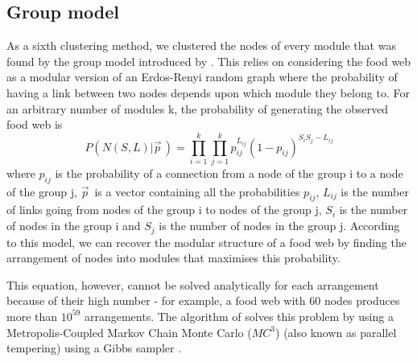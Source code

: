 \documentclass[twocolumn]{article}
\begin{document}
    \subsection*{Group model}
        As a sixth clustering method, we clustered the nodes of every module that was found by the group model introduced by \citet{Allesina2009a}. This relies on considering the food web as a modular version of an Erdos-Renyi random graph \citep{Erdos1959} where the probability of having a link between two nodes depends upon which module they belong to. For an arbitrary number of modules k, the probability of generating the observed food web is 
        \begin{equation}
            P(N(S,L)|\vec{p}^{\,})=\prod_{i=1}^k\prod_{j=1}^k p_{ij}^{L_{ij}} (1-p_{ij})^{S_i S_j - L_{ij}}
        \end{equation}
        where $p_{ij}$ is the probability of a connection from a node of the group i to a node of the group j, $\vec{p}^{\,}$ is a vector containing all the probabilities $p_{ij}$, $L_{ij}$ is the number of links going from nodes of the group i to nodes of the group j, $S_i$ is the number of nodes in the group i and $S_j$ is the number of nodes in the group j. According to this model, we can recover the modular structure of a food web by finding the arrangement of nodes into modules that maximises this probability.
        \par This equation, however, cannot be solved analytically for each arrangement because of their high number - for example, a food web with 60 nodes produces more than $10^{59}$ arrangements. The algorithm of \citet{Sander2015} solves this problem by using a Metropolis-Coupled Markov Chain Monte Carlo ($MC^3$) (also known as parallel tempering) \citep{Geyer1991} using a Gibbs sampler \citep{Yildirim2012}.
\end{document}
